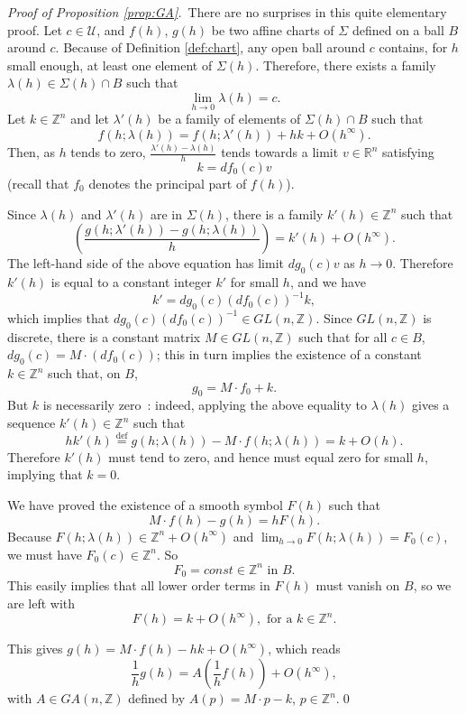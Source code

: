 \documentclass[cmp]{svjour}  %
\newenvironment{bew}[2]{\removelastskip\vspace{6pt}\noindent
 {\it Proof  #1.}~\rm#2}{\par\vspace{6pt}}
\newcommand{\fleche}{\rightarrow}
\newcommand{\egdef}{\stackrel{\mathrm{def}}{=}}
\newcommand{\RM}{\mathbb{R}}
\newcommand{\ZM}{\mathbb{Z}}
\newcommand{\U}{\mathcal{U}}
\begin{document}
\begin{bew}{of Proposition \ref{prop:GA}} There are no surprises in
  this quite elementary proof. Let $c\in \U$, and $f(h)$, $g(h)$ be
two affine charts of $\Sigma$ defined on a ball $B$ around
$c$. Because of Definition \ref{def:chart}, any open ball around $c$
contains, for $h$ small enough, at least one element of
$\Sigma(h)$. Therefore, there exists a family $\lambda(h)\in
\Sigma(h)\cap B$ such that
\[ \lim_{h\fleche 0} \lambda(h) = c.\]
Let $k\in\ZM^n$ and let $\lambda'(h)$ be a family of elements of
$\Sigma(h)\cap B$ such that
\[ f(h;\lambda(h)) = f(h;\lambda'(h)) + hk + O(h^\infty).\]
Then, as $h$ tends to zero, $\frac{\lambda'(h)-\lambda(h)}{h}$ tends
towards a limit $v\in\RM^n$ satisfying
\[ k = df_0(c)v \]
(recall that $f_0$ denotes the principal part of $f(h)$).

Since $\lambda(h)$ and $\lambda'(h)$ are in $\Sigma(h)$, there is a
family $k'(h)\in\ZM^n$ such that
\[ \left(\frac{g(h;\lambda'(h))-g(h;\lambda(h))}{h}\right) = k'(h) +
O(h^\infty).\] The left-hand side of the above equation has limit
$dg_0(c)v$ as $h\fleche 0$. Therefore $k'(h)$ is equal to a constant
integer $k'$ for small $h$, and we have
\[ k' = dg_0(c)(df_0(c))^{-1}k, \]
which implies that $dg_0(c)(df_0(c))^{-1}\in GL(n,\ZM)$. Since $GL(n,\ZM)$
is discrete, there is a constant matrix $M\in GL(n,\ZM)$ such that for
all $c\in B$, $dg_0(c)= M\cdot(df_0(c))$; this in turn implies the existence
of a constant $k\in\ZM^n$ such that, on $B$,
\[ g_0 = M\cdot f_0 + k. \]
But $k$ is necessarily zero~: indeed, applying the above equality to
$\lambda(h)$ gives a sequence $k'(h)\in\ZM^n$ such that
\[ hk'(h) \egdef g(h;\lambda(h))-M\cdot f(h;\lambda(h)) = k + O(h).\]
Therefore $k'(h)$ must tend to zero, and hence must equal zero for
small $h$, implying that $k=0$.

We have proved the existence of a
smooth symbol $F(h)$ such that
\[ M\cdot f(h)-g(h)= hF(h).\]
Because $F(h;\lambda(h))\in\ZM^n+O(h^\infty)$ and $\lim_{h\fleche
  0}F(h;\lambda(h))=F_0(c)$, we must have $F_0(c)\in\ZM^n$. So
\[ F_0 = const \in \ZM^n \textrm{ in } B.\]
This easily implies that all lower order terms in $F(h)$ must vanish
on $B$, so we are left with
\[ F(h) = k + O(h^\infty), \textrm{ for a }k\in\ZM^n.\]

This gives $g(h)=M\cdot f(h)-hk + O(h^\infty)$, which reads
\[ \frac{1}{h}g(h)=A(\frac{1}{h}f(h)) + O(h^\infty),\]
with $A\in GA(n,\ZM)$ defined by $A(p)=M\cdot p-k$, $p\in\ZM^n$.\qed
\end{bew}
\end{document}
